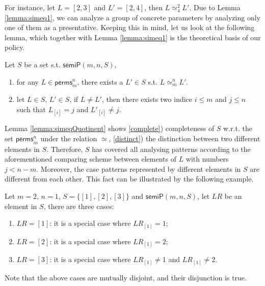 \documentclass[final]{IEEEtran}
\newcommand\lyj[1]{\textcolor{magenta}{lyj: #1}}
\newcommand\cai[1]{\textcolor{blue}{ #1} }
\newcommand\caicomment[1]{\textcolor{red}{comment: #1} }
\begin{document}
For instance, let $L=[2,3]$ and $L'=[2,4]$, then $L \simeq_{4}^2 L' $. %
Due to Lemma \ref{lemma:simeq1},
we can analyze a group of concrete parameters by analyzing only one of them as a presentative. Keeping this in mind, let us look at the following lemma, which together with Lemma \ref{lemma:simeq1} is the theoretical basis of our policy.


\begin{lemma}\label{lemma:simeqQuotinent}  Let $S $ be a set s.t.  $\mathsf{semiP}(m,n,S)$,
\begin{enumerate}
\item \label{complete}  for any $L \in \mathsf{perms}_{m}^{n}$, there exists a $L' \in S$ s.t. $L \simeq_m^n L'$.
\item \label{distinct} let $L \in S$, $L' \in S$, if $L \ne L'$, then there exists two indice $i \le m$ and $j \le n$ such that $L_{[i]}=j$ and $L'_{[i]}\ne j$.
\end{enumerate}
\end{lemma}

Lemma \ref{lemma:simeqQuotinent} shows \ref{complete}) completeness of $S$ w.r.t. the set $\mathsf{perms}_{m}^{n}$ under the relation $\simeq$, \ref{distinct})  the distinction between two different elements in $S$. Therefore, $S$ has covered all analysing patterns according to the aforementioned comparing scheme between elements of $L$ with numbers $j<n-m$. Moreover, the case patterns represented by different elements in $S$ are different from each other. This fact can be illustrated by the following example.
\begin{example}
Let $m=2$, $n=1$, $S=\{[1],[2],[3]\}$ and  $\mathsf{semiP}(m,n,S)$,  let $LR$ be an element in $S$, there are three cases:
\begin{enumerate}
\item $LR=[1]$: it is a special case where $LR_{[1]}=1 $;
\item $LR=[2]$: it is a special case where $LR_{[1]}=2 $;
\item $LR=[3]$: it is a special case where $LR_{[1]}\ne 1$ and $LR_{[1]}\ne 2$.
\end{enumerate}
\end{example}
Note that the above cases are mutually disjoint, and their disjunction  is true.
\end{document}
